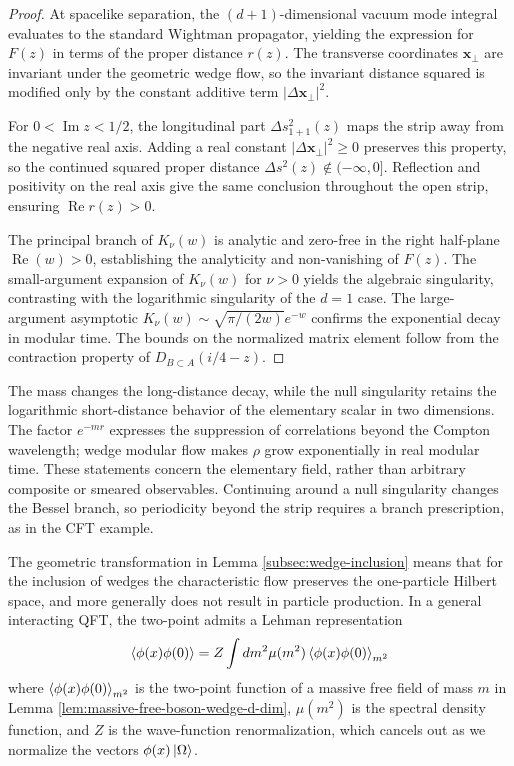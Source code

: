 \documentclass[a4paper,11pt]{article}
\theoremstyle{definition}
\begin{document}
\begin{proof}
At spacelike separation, the $(d+1)$-dimensional vacuum mode integral evaluates to the standard Wightman propagator, yielding the expression for $F(z)$ in terms of the proper distance $r(z)$. The transverse coordinates $\mathbf{x}_\perp$ are invariant under the geometric wedge flow, so the invariant distance squared is modified only by the constant additive term $|\Delta \mathbf{x}_\perp|^2$.

For $0 < \operatorname{Im} z < 1/2$, the longitudinal part $\Delta s_{1+1}^2(z)$ maps the strip away from the negative real axis. Adding a real constant $|\Delta \mathbf{x}_\perp|^2 \geq 0$ preserves this property, so the continued squared proper distance $\Delta s^2(z) \notin (-\infty, 0]$. Reflection and positivity on the real axis give the same conclusion throughout the open strip, ensuring $\operatorname{Re} r(z) > 0$. 

The principal branch of $K_{\nu}(w)$ is analytic and zero-free in the right half-plane $\operatorname{Re}(w) > 0$, establishing the analyticity and non-vanishing of $F(z)$. The small-argument expansion of $K_{\nu}(w)$ for $\nu > 0$ yields the algebraic singularity, contrasting with the logarithmic singularity of the $d=1$ case. The large-argument asymptotic $K_{\nu}(w) \sim \sqrt{\pi / (2w)} e^{-w}$ confirms the exponential decay in modular time. The bounds on the normalized matrix element follow from the contraction property of $D_{B \subset A}(i/4 - z)$.
\end{proof}


The mass changes the long-distance decay, while the null singularity retains the logarithmic short-distance behavior of the elementary scalar in two dimensions. The factor $e^{-m r}$ expresses the suppression of correlations beyond the Compton wavelength; wedge modular flow makes $\rho$ grow exponentially in real modular time. These statements concern the elementary field, rather than arbitrary composite or smeared observables. Continuing around a null singularity changes the Bessel branch, so periodicity beyond the strip requires a branch prescription, as in the CFT example.

The geometric transformation in Lemma \ref{subsec:wedge-inclusion} means that for the inclusion of wedges the characteristic flow preserves the one-particle Hilbert space, and more generally does not result in particle production. In a general interacting QFT, the two-point admits a Lehman representation 
\begin{align}
	\braket{\phi(x)\phi(0)}=Z\int dm^2 \mu(m^2)\braket{\phi(x)\phi(0)}_{m^2}
\end{align}
where $\braket{\phi(x)\phi(0)}_{m^2}$ is the two-point function of a massive free field of mass $m$ in Lemma \ref{lem:massive-free-boson-wedge-d-dim}, $\mu(m^2)$ is the spectral density function, and $Z$ is the wave-function renormalization, which cancels out as we normalize the vectors $\phi(x)\ket{\Omega}$.
\end{document}
